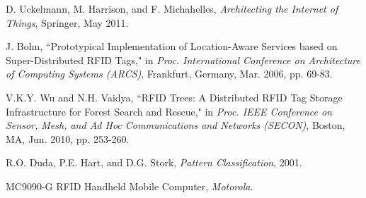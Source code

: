 \documentclass[conference]{IEEEtran}
\begin{document}
%
%
%
\begin{thebibliography}{1}

D. Uckelmann, M. Harrison, and F. Michahelles, \emph{Architecting the Internet of Things}, Springer, May 2011.

J. Bohn, ``Prototypical Implementation of Location-Aware Services based on Super-Distributed RFID Tags," in \emph{Proc. International Conference on Architecture of Computing Systems (ARCS)}, Frankfurt, Germany, Mar. 2006, pp. 69-83.

V.K.Y. Wu and N.H. Vaidya, ``RFID Trees: A Distributed RFID Tag Storage Infrastructure for Forest Search and Rescue," in \emph{Proc. IEEE Conference on Sensor, Mesh, and Ad Hoc Communications and Networks (SECON)}, Boston, MA, Jun. 2010, pp. 253-260.

R.O. Duda, P.E. Hart, and D.G. Stork, \emph{Pattern Classification}, 2001.

MC9090-G RFID Handheld Mobile Computer, \emph{Motorola}.

\end{thebibliography}




\end{document}
